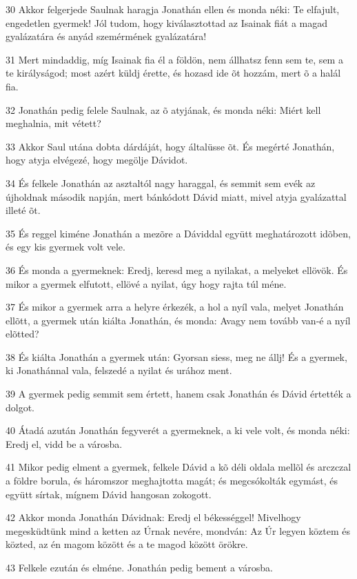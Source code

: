 \par 30 Akkor felgerjede Saulnak haragja Jonathán ellen és monda néki: Te elfajult, engedetlen gyermek! Jól tudom, hogy kiválasztottad az Isainak fiát a magad gyalázatára és anyád szemérmének gyalázatára!
\par 31 Mert mindaddig, míg Isainak fia él a földön, nem állhatsz fenn sem te, sem a te királyságod; most azért küldj érette, és hozasd ide õt hozzám, mert õ a halál fia.
\par 32 Jonathán pedig felele Saulnak, az õ atyjának, és monda néki: Miért kell meghalnia, mit vétett?
\par 33 Akkor Saul utána dobta dárdáját, hogy általüsse õt. És megérté Jonathán, hogy atyja elvégezé, hogy megölje Dávidot.
\par 34 És felkele Jonathán az asztaltól nagy haraggal, és semmit sem evék az újholdnak második napján, mert bánkódott Dávid miatt, mivel atyja gyalázattal illeté õt.
\par 35 És reggel kiméne Jonathán a mezõre a Dáviddal együtt meghatározott idõben, és egy kis gyermek volt vele.
\par 36 És monda a gyermeknek: Eredj, keresd meg a nyilakat, a melyeket ellövök. És mikor a gyermek elfutott, ellövé a nyilat, úgy hogy rajta túl méne.
\par 37 És mikor a gyermek arra a helyre érkezék, a hol a nyíl vala, melyet Jonathán ellõtt, a gyermek után kiálta Jonathán, és monda: Avagy nem tovább van-é a nyíl elõtted?
\par 38 És kiálta Jonathán a gyermek után: Gyorsan siess, meg ne állj! És a gyermek, ki Jonathánnal vala, felszedé a nyilat és urához ment.
\par 39 A gyermek pedig semmit sem értett, hanem csak Jonathán és Dávid értették a dolgot.
\par 40 Átadá azután Jonathán fegyverét a gyermeknek, a ki vele volt, és monda néki: Eredj el, vidd be a városba.
\par 41 Mikor pedig elment a gyermek, felkele Dávid a kõ déli oldala mellõl és arczczal a földre borula, és háromszor meghajtotta magát; és megcsókolták egymást, és együtt sírtak, mígnem Dávid hangosan zokogott.
\par 42 Akkor monda Jonathán Dávidnak: Eredj el békességgel! Mivelhogy megesküdtünk mind a ketten az Úrnak nevére, mondván: Az Úr legyen köztem és közted, az én magom között és a te magod között örökre.
\par 43 Felkele ezután és elméne. Jonathán pedig bement a városba.

